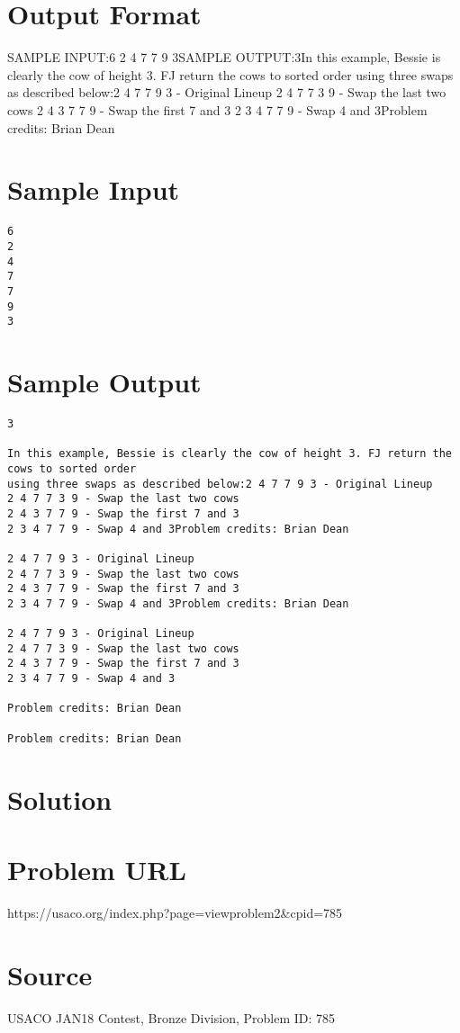 \documentclass[12pt]{article}
\begin{document}
\section*{Output Format}
SAMPLE INPUT:6
2
4
7
7
9
3SAMPLE OUTPUT:3In this example, Bessie is clearly the cow of height 3. FJ return the cows to sorted order
using three swaps as described below:2 4 7 7 9 3 - Original Lineup
2 4 7 7 3 9 - Swap the last two cows
2 4 3 7 7 9 - Swap the first 7 and 3
2 3 4 7 7 9 - Swap 4 and 3Problem credits: Brian Dean

\section*{Sample Input}
\begin{verbatim}
6
2
4
7
7
9
3
\end{verbatim}

\section*{Sample Output}
\begin{verbatim}
3

In this example, Bessie is clearly the cow of height 3. FJ return the cows to sorted order
using three swaps as described below:2 4 7 7 9 3 - Original Lineup
2 4 7 7 3 9 - Swap the last two cows
2 4 3 7 7 9 - Swap the first 7 and 3
2 3 4 7 7 9 - Swap 4 and 3Problem credits: Brian Dean

2 4 7 7 9 3 - Original Lineup
2 4 7 7 3 9 - Swap the last two cows
2 4 3 7 7 9 - Swap the first 7 and 3
2 3 4 7 7 9 - Swap 4 and 3Problem credits: Brian Dean

2 4 7 7 9 3 - Original Lineup
2 4 7 7 3 9 - Swap the last two cows
2 4 3 7 7 9 - Swap the first 7 and 3
2 3 4 7 7 9 - Swap 4 and 3

Problem credits: Brian Dean

Problem credits: Brian Dean
\end{verbatim}

\section*{Solution}


\section*{Problem URL}
https://usaco.org/index.php?page=viewproblem2&cpid=785

\section*{Source}
USACO JAN18 Contest, Bronze Division, Problem ID: 785
\end{document}
